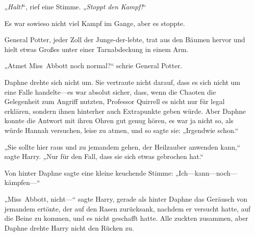„\emph{Halt!}“, rief eine Stimme. „\emph{Stoppt den Kampf!}“

Es war sowieso nicht viel Kampf im Gange, aber es stoppte.

General Potter, jeder Zoll der Junge-der-lebte, trat aus den Bäumen hervor und hielt etwas Großes unter einer Tarnabdeckung in einem Arm.

„Atmet Miss~Abbott noch normal?“ schrie General Potter.

Daphne drehte sich nicht um. Sie vertraute nicht darauf, dass es sich nicht um eine Falle handelte—es war absolut sicher, dass, wenn die Chaoten die Gelegenheit zum Angriff nutzten, Professor Quirrell es nicht nur für legal erklären, sondern ihnen hinterher auch Extrapunkte geben würde. Aber Daphne konnte die Antwort mit ihren Ohren gut genug hören, es war ja nicht so, als würde Hannah versuchen, leise zu atmen, und so sagte sie: „Irgendwie schon.“

„Sie sollte hier raus und zu jemandem gehen, der Heilzauber anwenden kann,“ sagte Harry. „Nur für den Fall, dass sie sich etwas gebrochen hat.“

Von hinter Daphne sagte eine kleine keuchende Stimme: „Ich—kann—noch—kämpfen—“

„Miss~Abbott, nicht—“ sagte Harry, gerade als hinter Daphne das Geräusch von jemandem ertönte, der auf den Rasen zurücksank, nachdem er versucht hatte, auf die Beine zu kommen, und es nicht geschafft hatte. Alle zuckten zusammen, aber Daphne drehte Harry nicht den Rücken zu.


